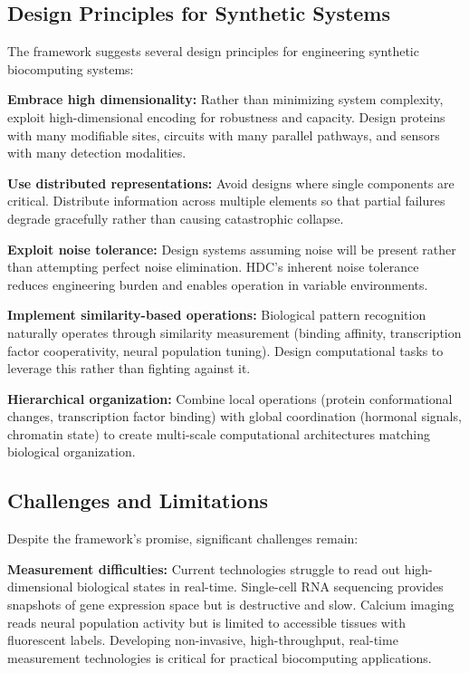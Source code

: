 \documentclass[12pt]{article}
\begin{document}
\subsection{Design Principles for Synthetic Systems}

The framework suggests several design principles for engineering synthetic biocomputing systems:

\textbf{Embrace high dimensionality:} Rather than minimizing system complexity, exploit high-dimensional encoding for robustness and capacity. Design proteins with many modifiable sites, circuits with many parallel pathways, and sensors with many detection modalities.

\textbf{Use distributed representations:} Avoid designs where single components are critical. Distribute information across multiple elements so that partial failures degrade gracefully rather than causing catastrophic collapse.

\textbf{Exploit noise tolerance:} Design systems assuming noise will be present rather than attempting perfect noise elimination. HDC's inherent noise tolerance reduces engineering burden and enables operation in variable environments.

\textbf{Implement similarity-based operations:} Biological pattern recognition naturally operates through similarity measurement (binding affinity, transcription factor cooperativity, neural population tuning). Design computational tasks to leverage this rather than fighting against it.

\textbf{Hierarchical organization:} Combine local operations (protein conformational changes, transcription factor binding) with global coordination (hormonal signals, chromatin state) to create multi-scale computational architectures matching biological organization.

\subsection{Challenges and Limitations}

Despite the framework's promise, significant challenges remain:

\textbf{Measurement difficulties:} Current technologies struggle to read out high-dimensional biological states in real-time. Single-cell RNA sequencing provides snapshots of gene expression space but is destructive and slow. Calcium imaging reads neural population activity but is limited to accessible tissues with fluorescent labels. Developing non-invasive, high-throughput, real-time measurement technologies is critical for practical biocomputing applications.
\end{document}
